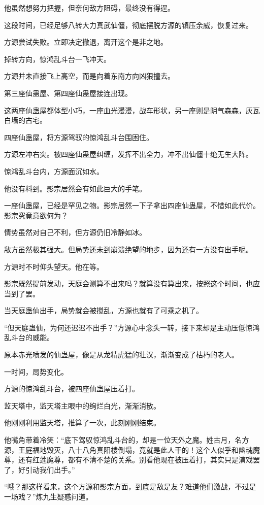 \begin{this_body}
他虽然想努力把握，但奈何敌方阻碍，最终没有得逞。

这段时间，已经足够八转大力真武仙僵，彻底摆脱方源的镇压余威，恢复过来。

方源尝试失败。立即决定撤退，离开这个是非之地。

掉转方向，惊鸿乱斗台一飞冲天。

方源并未直接飞上高空，而是向着东南方向凶狠撞去。

第三座仙蛊屋、第四座仙蛊屋接连出现。

这两座仙蛊屋都体型小巧，一座血光漫漫，战车形状，另一座则是阴气森森，灰瓦白墙的古宅。

四座仙蛊屋，将方源驾驭的惊鸿乱斗台围困住。

方源左冲右突。被四座仙蛊屋纠缠，发挥不出全力，冲不出仙僵十绝无生大阵。

惊鸿乱斗台内，方源面沉如水。

他没有料到。影宗居然会有如此巨大的手笔。

一座仙蛊屋，已经是罕见之物。影宗居然一下子拿出四座仙蛊屋，不惜如此代价。影宗究竟意欲何为？

情势虽然对自己不利，但方源仍旧冷静如冰。

敌方虽然极其强大。但局势还未到崩溃绝望的地步，因为还有一方没有出手呢。

方源时不时仰头望天。他在等。

影宗既然提前发动，天庭会测算不出来吗？就算没有算出来，按照这个时间，也应当到了罢。

当天庭蛊仙出手，局势就会被搅乱，方源也就有了可乘之机了。

“但天庭蛊仙，为何还迟迟不出手？”方源心中念头一转，接下来却是主动压低惊鸿乱斗台的威能。

原本赤光喷发的仙蛊屋，像是从龙精虎猛的壮汉，渐渐变成了枯朽的老人。

一时间，局势变化。

方源的惊鸿乱斗台，被四座仙蛊屋压着打。

监天塔中，监天塔主眼中的绚烂白光，渐渐消散。

他刚刚利用监天塔，推算了一次，此刻刚刚结束。

他嘴角带着冷笑：“底下驾驭惊鸿乱斗台的，却是一位天外之魔。姓古月，名方源，王庭福地毁灭，八十八角真阳楼倒塌，竟就是此人干的！这个人似乎和幽魂魔尊，还有红莲魔尊，都有不清不楚的关系。别看他现在被压着打，其实只是演戏罢了，好引动我们出手。”

“哦？那这样看来，这个方源和影宗方面，到底是敌是友？难道他们激战，不过是一场戏？”炼九生疑惑问道。


\end{this_body}
